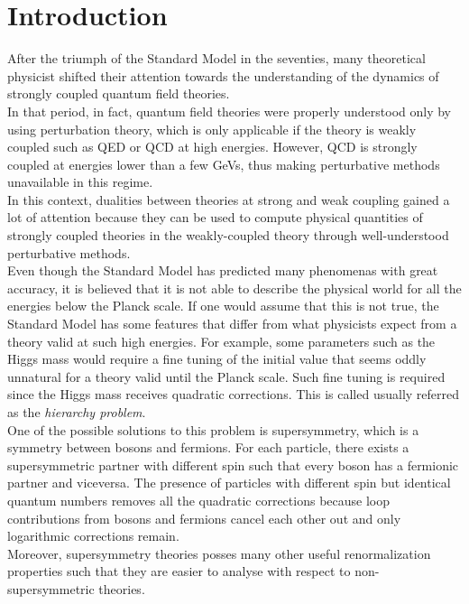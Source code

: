\cleardoublepage
\chapter{Introduction}
After the triumph of the Standard Model in the seventies, many theoretical physicist shifted their attention towards the understanding of the dynamics of strongly coupled quantum field theories. \\
In that period, in fact, quantum field theories were properly understood only by using perturbation theory, which is only applicable if the theory is weakly coupled such as QED or QCD at high energies.
However, QCD is strongly coupled at energies lower than a few GeVs, thus making perturbative methods unavailable in this regime.
\\
In this context, dualities between theories at strong and weak coupling gained a lot of attention because they can be used to compute physical quantities of strongly coupled theories in the weakly-coupled theory through well-understood perturbative methods.
\\

Even though the Standard Model has predicted many phenomenas with great accuracy, it is believed that it is not able to describe the physical world for all the energies below the Planck scale.
If one would assume that this is not true, the Standard Model has some features that differ from what physicists expect from a theory valid at such high energies.
For example, some parameters such as the Higgs mass would require a fine tuning of the initial value that seems oddly unnatural for a theory valid until the Planck scale.
Such fine tuning is required since the Higgs mass receives quadratic corrections.
This is called usually referred as the \emph{hierarchy problem}.
\\
One of the possible solutions to this problem is supersymmetry, which is a symmetry between bosons and fermions. 
For each particle, there exists a supersymmetric partner with different spin  such that every boson has a fermionic partner and viceversa.
The presence of particles with different spin but identical quantum numbers removes all the quadratic corrections because loop contributions from bosons and fermions cancel each other out and only logarithmic corrections remain.
\\
Moreover, supersymmetry theories posses many other useful renormalization properties such that they are easier to analyse with respect to non-supersymmetric theories.\\


